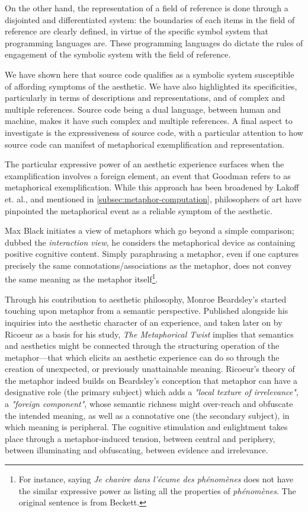 On the other hand, the representation of a field of reference is done through a disjointed and differentiated system: the boundaries of each items in the field of reference are clearly defined, in virtue of the specific symbol system that programming languages are. These programming languages do dictate the rules of engagement of the symbolic system with the field of reference.

We have shown here that source code qualifies as a symbolic system susceptible of affording symptoms of the aesthetic. We have also highlighted its specificities, particularly in terms of descriptions and representations, and of complex and multiple references. Source code being a dual language, between human and machine, makes it have such complex and multiple references. A final aspect to investigate is the expressiveness of source code, with a particular attention to how source code can manifest of metaphorical exemplification and representation.

The particular expressive power of an aesthetic experience surfaces when the examplification involves a foreign element, an event that Goodman refers to as metaphorical exemplification. While this approach has been broadened by Lakoff et. al., and mentioned in \ref{subsec:metaphor-computation}, philosophers of art have pinpointed the metaphorical event as a reliable symptom of the aesthetic.

Max Black initiates a view of metaphors which go beyond a simple comparison; dubbed the \emph{interaction view}, he considers the metaphorical device as containing positive cognitive content. Simply paraphrasing a metaphor, even if one captures precisely the same connotations/associations as the metaphor, does not convey the same meaning as the metaphor itself\footnote{For instance, saying \emph{Je chavire dans l'écume des phénomènes} does not have the similar expressive power as listing all the properties of \emph{phénomènes}. The original sentence is from Beckett.}.

Through his contribution to aesthetic philosophy, Monroe Beardsley's started touching upon metaphor from a semantic perspective. Published alongside his inquiries into the aesthetic character of an experience, and taken later on by Ricoeur as a basis for his study, \emph{The Metaphorical Twist} implies that semantics and aesthetics might be connected through the structuring operation of the metaphor—that which elicits an aesthetic experience can do so through the creation of unexpected, or previously unattainable meaning. Ricoeur's theory of the metaphor indeed builds on Beardsley's conception that metaphor can have a designative role (the primary subject) which adds a \emph{"local texture of irrelevance"}, a \emph{"foreign component"}, whose semantic richness might over-reach and obfuscate the intended meaning, as well as a connotative one (the secondary subject), in which meaning is peripheral. The cognitive stimulation and enlightment takes place through a metaphor-induced tension, between central and periphery, between illuminating and obfuscating, between evidence and irrelevance.

